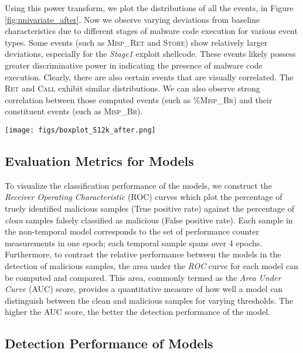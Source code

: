 \documentclass{acm_proc_article-sp}
\begin{document}
Using this power transform, we plot the distributions of all the events, in Figure \ref{fig:univariate_after}. Now we observe varying deviations from baseline characteristics due to different stages of malware code execution for various event types. Some events (such as \textsc{Misp\_Ret} and \textsc{Store}) show relatively larger deviations, especially for the \textit{Stage1} exploit shellcode. These events likely possess greater discriminative power in indicating the presence of malware code execution. Clearly, there are also certain events that are visually correlated. The \textsc{Ret} and \textsc{Call} exhibit similar distributions. We can also observe strong correlation between those computed events (such as \textsc{\%Misp\_Br}) and their constituent events (such as \textsc{Misp\_Br}).

\begin{figure*}
  \centering
  \texttt{[image: figs/boxplot\_512k\_after.png]}
  \caption{Distribution comparison of all the events (\textit{after} power transform), with more discernible deviations.}
  \label{fig:univariate_after}
\end{figure*}


\subsection{Evaluation Metrics for Models}


To visualize the classification performance of the models, we construct the \emph{Receiver Operating Characteristic} (ROC) curves which plot the percentage of truely identified malicious samples (True positive rate) against the percentage of \textit{clean} samples falsely classified as malicious (False positive rate). Each sample in the non-temporal model corresponds to the set of performance counter measurements in one epoch; each temporal sample spans over 4 epochs. Furthermore, to contrast the relative performance between the models in the detection of malicious samples, the area under the \emph{ROC} curve for each model can be computed and compared. This area, commonly termed as the \emph{Area Under Curve} (AUC) score, provides a quantitative measure of how well a model can distinguish between the clean and malicious samples for varying thresholds. The higher the AUC score, the better the detection performance of the model.


\subsection{Detection Performance of Models}
\label{sec:eval_auc}
\end{document}
